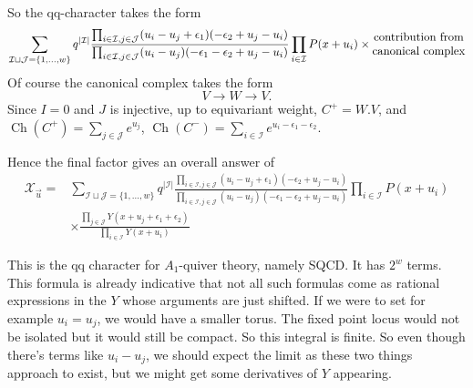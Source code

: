 \documentclass[leqno, openany]{memoir}
\theoremstyle{definition}
\theoremstyle{remark}
\theoremstyle{plain}
\theoremstyle{definition}
\theoremstyle{remark}
\newcommand{\on}[1]{\operatorname{#1}}
\begin{document}
So the qq-character takes the form 
\[
\sum_{\mathcal{I} \sqcup \mathcal{J} = \{1,\dots,w\}} q^{|\mathcal{I}|} \frac{\prod_{i \in \mathcal{I},j \in \mathcal{J}}(u_i - u_j  + \epsilon_1)(-\epsilon_2 + u_j - u_i)}{\prod_{i \in \mathcal{I},j \in \mathcal{J}}(u_i - u_j)(-\epsilon_1 - \epsilon_2 + u_j - u_i)} \prod_{i \in \mathcal{I}} P(x + u_i) \times \Centerstack{{contribution from} {canonical complex}}
\]
Of course the canonical complex takes the form 
\[
V \to W \to V.
\]
Since $I = 0$ and $J$ is injective, up to equivariant weight,
$C^+ = W.V$, and $\on{Ch}(C^+) = \sum_{j \in \mathcal{J}} e^{u_j}$, $\on{Ch}(C^-) = \sum_{i \in \mathcal{I}} e^{u_i - \epsilon_1 - \epsilon_2}$.

Hence the final factor gives an overall answer of 
\begin{align*}
    \mathcal{X}_{\vec{u}} =&{} \sum_{\mathcal{I} \sqcup \mathcal{J} = \{1,\dots,w\}} q^{|\mathcal{I}|} \frac{\prod_{i \in \mathcal{I},j \in \mathcal{J}}(u_i - u_j  + \epsilon_1)(-\epsilon_2 + u_j - u_i)}{\prod_{i \in \mathcal{I},j \in \mathcal{J}}(u_i - u_j)(-\epsilon_1 - \epsilon_2 + u_j - u_i)} \prod_{i \in \mathcal{I}} P(x + u_i) \\ &\times \frac{\prod_{j \in \mathcal{J}} Y(x + u_j + \epsilon_1 + \epsilon_2)}{\prod_{i \in \mathcal{I}} Y(x + u_i)}
\end{align*}

This is the qq character for $A_1$-quiver theory, namely SQCD. It has $2^w$ terms. This formula is already indicative that not all such formulas come as rational expressions in the $Y$ whose arguments are just shifted.
If we were to set for example $u_i = u_j$, we would have a smaller torus. The fixed point locus would not be isolated but it would still be compact. So this integral is finite. So even though there's terms like $u_i - u_j$, we should expect the limit as these two things approach to exist, but we might get some derivatives of $Y$ appearing.
\end{document}

